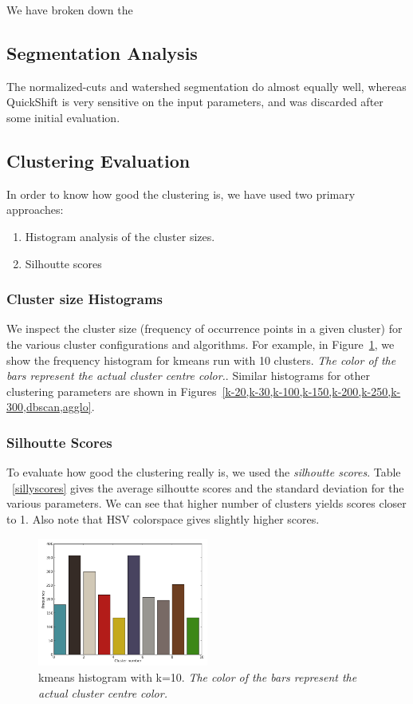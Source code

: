 \documentclass[10pt,twocolumn,letterpaper]{article}
\begin{document}
We have broken down the 

\subsection{Segmentation Analysis}

The normalized-cuts and watershed segmentation do almost equally well,
whereas QuickShift is very sensitive on the input parameters, and was
discarded after some initial evaluation. 

\subsection{Clustering Evaluation}

In order to know how good the clustering is, we have used two primary
approaches:
\begin{enumerate}
\item Histogram analysis of the cluster sizes. 
\item Silhoutte scores
\end{enumerate}

\subsubsection{Cluster size Histograms}

We inspect the cluster size (frequency of occurrence points in a given
cluster) for the various cluster configurations and algorithms. For
example, in Figure~\ref{k-10}, we show the frequency histogram for
kmeans run with 10 clusters. \emph{The color of the bars represent the
  actual cluster centre color.}. Similar histograms for other
clustering parameters are shown in
Figures~\ref{k-20,k-30,k-100,k-150,k-200,k-250,k-300,dbscan,agglo}.



\subsubsection{Silhoutte Scores}

To evaluate how good the clustering really is, we used the
\emph{silhoutte scores}. Table ~\ref{sillyscores} gives the average
silhoutte scores and the standard deviation for the various
parameters.  We can see that higher number of clusters yields scores
closer to 1. Also note that HSV colorspace gives slightly higher
scores. 

\begin{figure}[p]
  \centering
  \includegraphics[width=0.50\textwidth]{../results/10_histogram.png}
  \caption{kmeans histogram with k=10. \emph{The color of the bars
represent the actual cluster centre color.}}
  \label{k-10}
\end{figure}
\end{document}
